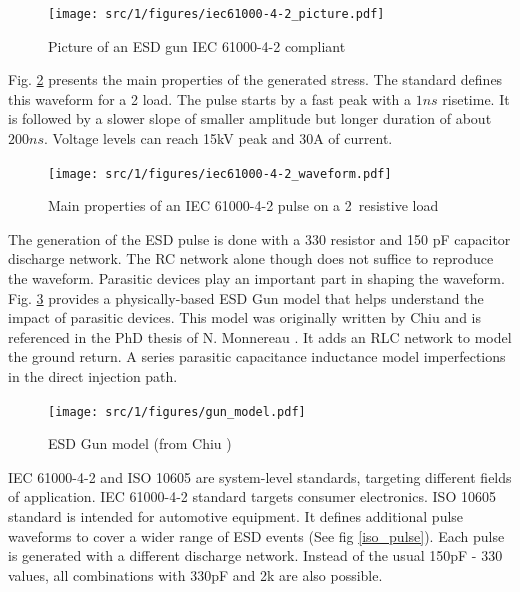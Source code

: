 \begin{figure}[!h]
  \centering
  \texttt{[image: src/1/figures/iec61000-4-2\_picture.pdf]}
  \caption{Picture of an ESD gun IEC 61000-4-2 compliant}
  \label{fig:picture-esd-gun}
\end{figure}

Fig. \ref{iec_pulse} presents the main properties of the generated stress.
The standard defines this waveform for a 2\textOmega{} load.
The pulse starts by a fast peak with a $1ns$ risetime.
It is followed by a slower slope of smaller amplitude but longer duration of about $200ns$.
Voltage levels can reach 15kV peak and 30A of current.

\begin{figure}[!h]
  \centering
  \texttt{[image: src/1/figures/iec61000-4-2\_waveform.pdf]}
  \caption{Main properties of an IEC 61000-4-2 pulse on a 2\textOmega\ resistive load}
  \label{iec_pulse}
\end{figure}

The generation of the ESD pulse is done with a 330\textOmega{} resistor and 150 pF capacitor discharge network.
The RC network alone though does not suffice to reproduce the waveform.
Parasitic devices play an important part in shaping the waveform.
Fig. \ref{fig:esd-gun-model} provides a physically-based ESD Gun model that helps understand the impact of parasitic devices.
This model was originally written by Chiu \cite{phd-chiu} and is referenced in the PhD thesis of N. Monnereau \cite{phd-monnereau}.
It adds an RLC network to model the ground return.
A series parasitic capacitance inductance model imperfections in the direct injection path.

\begin{figure}[!h]
  \centering
  \texttt{[image: src/1/figures/gun\_model.pdf]}
  \caption{ESD Gun model (from Chiu \cite{phd-chiu})}
  \label{fig:esd-gun-model}
\end{figure}

IEC 61000-4-2 \cite{iec61000-4-2} and ISO 10605 \cite{iso10605} are system-level standards, targeting different fields of application.
IEC 61000-4-2\cite{iec61000-4-2} standard targets consumer electronics.
ISO 10605\cite{iso10605} standard is intended for automotive equipment.
It defines additional pulse waveforms to cover a wider range of ESD events (See fig \ref{iso_pulse}).
Each pulse is generated with a different discharge network.
Instead of the usual 150pF - 330\textOmega{} values, all combinations with 330pF and 2k\textOmega{} are also possible.

